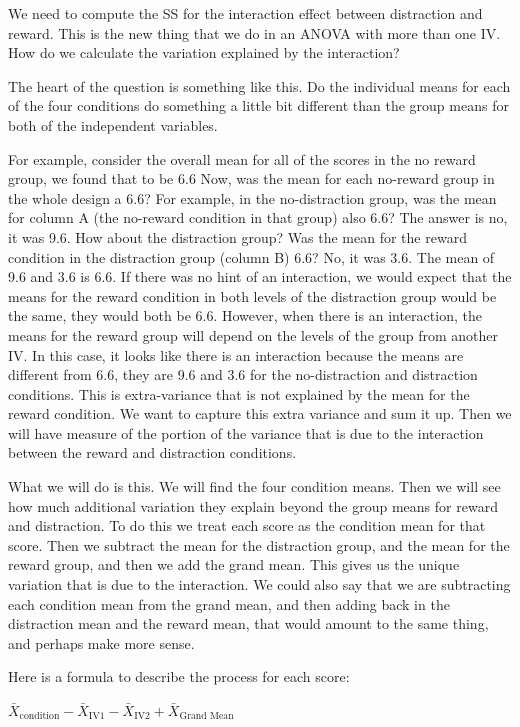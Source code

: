 \documentclass[
]{book}
\begin{document}
We need to compute the SS for the interaction effect between distraction and reward. This is the new thing that we do in an ANOVA with more than one IV. How do we calculate the variation explained by the interaction?

The heart of the question is something like this. Do the individual means for each of the four conditions do something a little bit different than the group means for both of the independent variables.

For example, consider the overall mean for all of the scores in the no reward group, we found that to be 6.6 Now, was the mean for each no-reward group in the whole design a 6.6? For example, in the no-distraction group, was the mean for column A (the no-reward condition in that group) also 6.6? The answer is no, it was 9.6. How about the distraction group? Was the mean for the reward condition in the distraction group (column B) 6.6? No, it was 3.6. The mean of 9.6 and 3.6 is 6.6. If there was no hint of an interaction, we would expect that the means for the reward condition in both levels of the distraction group would be the same, they would both be 6.6. However, when there is an interaction, the means for the reward group will depend on the levels of the group from another IV. In this case, it looks like there is an interaction because the means are different from 6.6, they are 9.6 and 3.6 for the no-distraction and distraction conditions. This is extra-variance that is not explained by the mean for the reward condition. We want to capture this extra variance and sum it up. Then we will have measure of the portion of the variance that is due to the interaction between the reward and distraction conditions.

What we will do is this. We will find the four condition means. Then we will see how much additional variation they explain beyond the group means for reward and distraction. To do this we treat each score as the condition mean for that score. Then we subtract the mean for the distraction group, and the mean for the reward group, and then we add the grand mean. This gives us the unique variation that is due to the interaction. We could also say that we are subtracting each condition mean from the grand mean, and then adding back in the distraction mean and the reward mean, that would amount to the same thing, and perhaps make more sense.

Here is a formula to describe the process for each score:

\(\bar{X}_\text{condition} -\bar{X}_\text{IV1} - \bar{X}_\text{IV2} + \bar{X}_\text{Grand Mean}\)
\end{document}
